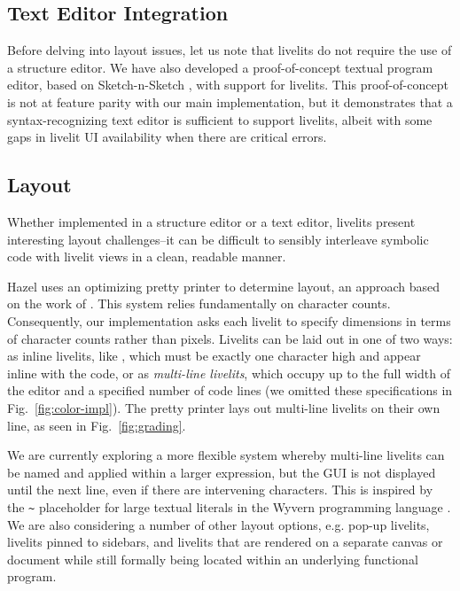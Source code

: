 \subsection{Text Editor Integration}
Before delving into layout issues, let us note that livelits do not require the use of a structure editor. 
We have also developed a 
proof-of-concept textual program editor, based on Sketch-n-Sketch \cite{sns-pldi,sns-uist}, with support for livelits.
This proof-of-concept is not at feature parity with 
our main implementation, but it demonstrates that a syntax-recognizing text editor \cite{DBLP:journals/tosem/BallanceGV92,DBLP:conf/sde/HorganM84} 
is sufficient to support livelits, albeit with some gaps in livelit UI availability when 
there are critical errors.

\subsection{Layout}\label{sec:layout}
Whether implemented in a structure editor or a text editor, livelits present 
interesting layout challenges--it can be difficult to sensibly 
interleave symbolic code with livelit views in a clean, readable manner.

Hazel uses an optimizing pretty printer to determine layout, an approach 
based on the work of \citet{DBLP:journals/pacmpl/Bernardy17}. This system relies 
fundamentally on character counts. Consequently, our implementation asks each 
livelit to specify dimensions in terms of character counts rather than pixels.
Livelits can be laid out in one of two ways: as inline livelits, like ,
which must be exactly one character high and appear inline with the code,
or as \emph{multi-line livelits}, which occupy up to the full width of the editor 
and a specified number of code lines (we omitted these specifications in Fig.~\ref{fig:color-impl}). 
The pretty printer lays out multi-line livelits
on their own line, as seen in Fig.~\ref{fig:grading}. 

We are currently exploring a more flexible system whereby 
multi-line livelits can be named and applied within a larger expression, but
the GUI is not displayed until the next line, even if there are intervening characters.
This is inspired by the \verb|~| placeholder for large textual literals in the 
Wyvern programming language \cite{TSLs}. We are also considering a number of other layout 
options, e.g. pop-up livelits, livelits pinned to sidebars, and livelits that are rendered  
on a separate canvas or document while still formally being located within an underlying functional program. 

